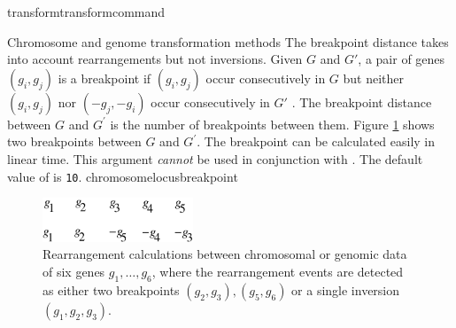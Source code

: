 \begin{command}{transform}{transformcommand}
\begin{arguments}
\begin{argumentgroup}{Chromosome and genome transformation methods}
{                The breakpoint distance takes into account rearrangements but not inversions.
                Given $G$ and $G'$, a pair of genes $(g_i, g_j)$ is a breakpoint if $(g_i, g_j)$ occur 
                consecutively in $G$ but neither $(g_i, g_j)$ nor $(-g_j, -g_i)$ occur
                consecutively in $G'$  \cite{sankoffandblanchette1998}.  The breakpoint distance between $G$
	      and $G^\prime$ is the number of breakpoints between them.  Figure \ref{fig:distance} 
                shows two breakpoints between $G$ and $G^\prime$. The breakpoint can be calculated 
                easily in linear time.  This argument \emph{cannot} be used in
                conjunction with . %
                The default value of  is \texttt{10}.} 
                {chromosomelocusbreakpoint} 
            
		   
		    \begin{figure}[!htbp]
		        \begin{center}
        		    \includegraphics[width=0.4\textwidth]{doc/figures/breakpointDis.pdf}
      		    \end{center}
		        \caption{Rearrangement calculations between chromosomal or genomic 
		        data of six genes $g_1, \ldots, g_6$, where the rearrangement events 
		        are detected as either two breakpoints $(g_2, g_3), (g_5, g_6)$
                    or a single inversion $(g_1, g_2, g_3)$.}
                \label{fig:distance}
		    \end{figure}
		
	        \begin{description}                 
                            
                        

\end{description}
\end{argumentgroup}
\end{arguments}
\end{command}
